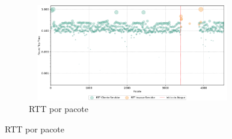 \begin{apendicesenv}
\begin{figure}[htbp!]
    ~
    \begin{subfigure}[t]{0.5\textwidth}
        \centering
        \caption{RTT por pacote}
        \includegraphics[width=1\textwidth, height=120pt]{USPSC-img/output/cropped/1-dos_translate_browse_path_call_stack_overflow-rttp.png}
    \end{subfigure}%
\end{figure}


\end{apendicesenv}
